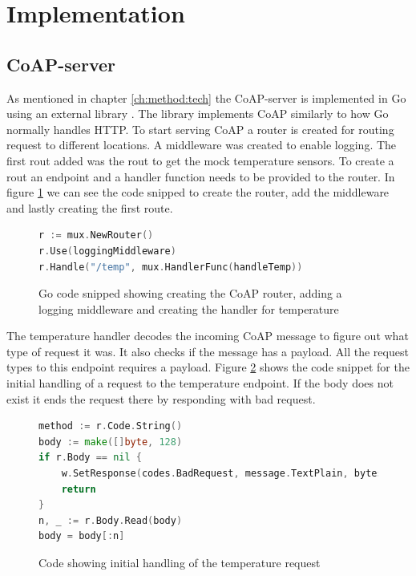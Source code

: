 \section{Implementation}
\label{ch:impl}
\noindent	

\subsection{CoAP-server}
As mentioned in chapter \ref{ch:method:tech} the CoAP-server is implemented in Go using an external library \cite{goCOAP}. The library implements CoAP similarly to how Go normally handles HTTP. To start serving CoAP a router is created for routing request to different locations. A middleware was created to enable logging. The first rout added was the rout to get the mock temperature sensors. To create a rout an endpoint and a handler function needs to be provided to the router. In figure \ref{code:router} we can see the code snipped to create the router, add the middleware and lastly creating the first route.

\begin{figure}[H]
    \begin{lstlisting}[language=go]
r := mux.NewRouter()
r.Use(loggingMiddleware)
r.Handle("/temp", mux.HandlerFunc(handleTemp))
    \end{lstlisting}
    \caption{Go code snipped showing creating the CoAP router, adding a logging middleware and creating the handler for temperature}
    \label{code:router}
\end{figure}

The temperature handler decodes the incoming CoAP message to figure out what type of request it was. It also checks if the message has a payload. All the request types to this endpoint requires a payload. Figure \ref{code:temp:body} shows the code snippet for the initial handling of a request to the temperature endpoint. If the body does not exist it ends the request there by responding with bad request.
\begin{figure}[H]
    \begin{lstlisting}[language=go]
method := r.Code.String()
body := make([]byte, 128)
if r.Body == nil {
    w.SetResponse(codes.BadRequest, message.TextPlain, bytes.NewReader([]byte(string("No body included"))))
    return
}
n, _ := r.Body.Read(body)
body = body[:n]
\end{lstlisting}
    \caption{Code showing initial handling of the temperature request}
    \label{code:temp:body}
\end{figure}

